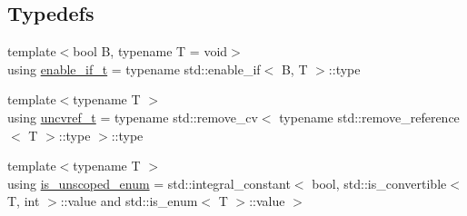 \subsection*{Typedefs}
\begin{DoxyCompactItemize}
\item 
{\footnotesize template$<$bool B, typename T  = void$>$ }\\using \mbox{\hyperlink{namespacenlohmann_1_1detail_a02bcbc878bee413f25b985ada771aa9c}{enable\+\_\+if\+\_\+t}} = typename std\+::enable\+\_\+if$<$ B, T $>$\+::type
\item 
{\footnotesize template$<$typename T $>$ }\\using \mbox{\hyperlink{namespacenlohmann_1_1detail_a53a082eedad9f4729fcd8fed552a21f7}{uncvref\+\_\+t}} = typename std\+::remove\+\_\+cv$<$ typename std\+::remove\+\_\+reference$<$ T $>$\+::type $>$\+::type
\item 
{\footnotesize template$<$typename T $>$ }\\using \mbox{\hyperlink{namespacenlohmann_1_1detail_ab0f6dad10410de436710870e8acc386b}{is\+\_\+unscoped\+\_\+enum}} = std\+::integral\+\_\+constant$<$ bool, std\+::is\+\_\+convertible$<$ T, int $>$\+::value and std\+::is\+\_\+enum$<$ T $>$\+::value $>$
\end{DoxyCompactItemize}

